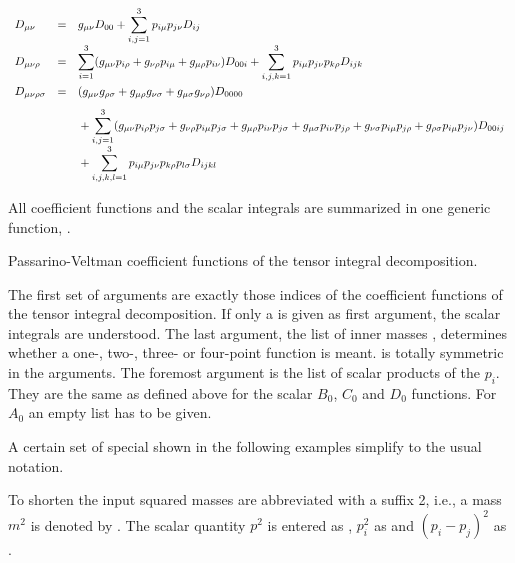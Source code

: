 \[\begin{array}{lll}
D_{\mu \nu } &=& g_{\mu \nu }D_{00}
+ \displaystyle\sum_{i,j=1}^{3} p_{i\mu} p_{j\nu }D_{ij} \\[1em]
D_{\mu \nu \rho } &=&
\displaystyle\sum_{i=1}^{3}(g_{\mu \nu }p_{i\rho }+g_{\nu \rho }p_{i\mu }
+ g_{\mu \rho }p_{i\nu }) D_{00i}
+ \sum_{i,j,k=1}^{3} p_{i\mu} p_{j\nu }p_{k\rho}D_{ijk} \\[1.4em]
D_{\mu \nu \rho \sigma } &=&
(g_{\mu\nu}g_{\rho \sigma} + g_{\mu\rho}g_{\nu \sigma }
+ g_{\mu\sigma}g_{\nu\rho }) D_{0000}\\ [.8em]
&&\mbox{}+\displaystyle\sum_{i,j=1}^{3}(g_{\mu \nu }p_{i\rho}p_{j\sigma}
+ g_{\nu \rho }p_{i\mu }p_{j\sigma} + g_{\mu \rho }p_{i\nu}p_{j\sigma}
+ g_{\mu \sigma}p_{i\nu}p_{j\rho }+ g_{\nu \sigma}p_{i\mu}p_{j\rho }
+ g_{\rho \sigma}p_{i\mu}p_{j\nu}) D_{00ij} \\[.8em]
&&\mbox{}+\displaystyle\sum_{i,j,k,l=1}^{3} p_{i\mu} p_{j\nu
}p_{k\rho}p_{l\sigma}D_{ijkl}
\end{array}
\]

All coefficient functions and the scalar integrals
are summarized in one generic function, .

 {Passarino-Veltman coefficient functions of the tensor integral decomposition.}

The first set of arguments  are exactly those 
indices of the coefficient functions of the tensor integral decomposition.
If only a  is given as first argument, the scalar integrals are 
understood. The last argument, the list of inner masses 
, determines whether a one-, two-,
three- or four-point function is meant. 
 is totally symmetric in the   arguments.
The foremost argument is the list of scalar products of the $p_i$.
They are the same as defined above for the scalar $B_0$, $C_0$ and 
$D_0$ functions. For $A_0$ an empty list has to be given.

A certain set of special  shown in the following 
examples simplify to the usual notation.

To shorten the input squared masses are abbreviated with a suffix 2,
i.e., a mass $m^2$ is denoted by .
The scalar quantity $p^2$ is entered as ,
$p_i^2$ as  and  $(p_i-p_j)^2$ as .


